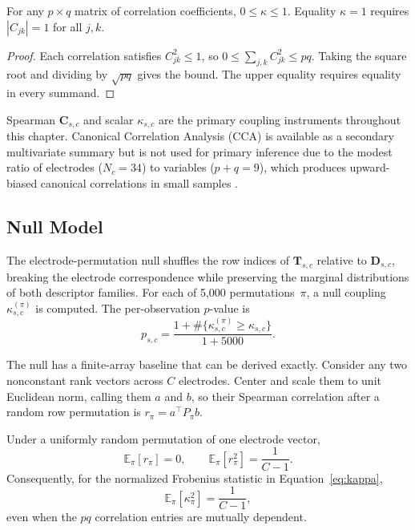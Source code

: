 \begin{proposition}
\label{prop:kappa_range}
For any $p\times q$ matrix of correlation coefficients,
$0\le\kappa\le1$. Equality $\kappa=1$ requires
$|C_{jk}|=1$ for all $j,k$.
\end{proposition}

\begin{proof}
Each correlation satisfies $C_{jk}^2\le1$, so
$0\le\sum_{j,k}C_{jk}^2\le pq$. Taking the square root and dividing by
$\sqrt{pq}$ gives the bound. The upper equality requires equality in every
summand.
\end{proof}

Spearman $\mathbf{C}_{s,c}$ and scalar $\kappa_{s,c}$ are the primary coupling instruments throughout this chapter. Canonical Correlation Analysis (CCA) is available as a secondary multivariate summary but is not used for primary inference due to the modest ratio of electrodes ($N_c = 34$) to variables ($p + q = 9$), which produces upward-biased canonical correlations in small samples \cite{wang_cca_2020}.

\subsection{Null Model}

The electrode-permutation null shuffles the row indices of $\mathbf{T}_{s,c}$ relative to $\mathbf{D}_{s,c}$, breaking the electrode correspondence while preserving the marginal distributions of both descriptor families. For each of 5,000 permutations~$\pi$, a null coupling $\kappa_{s,c}^{(\pi)}$ is computed. The per-observation $p$-value is
\begin{equation}
p_{s,c} = \frac{1 + \#\{\kappa_{s,c}^{(\pi)} \ge \kappa_{s,c}\}}{1 + 5000}.
\end{equation}

The null has a finite-array baseline that can be derived exactly. Consider any
two nonconstant rank vectors across $C$ electrodes. Center and scale them to unit
Euclidean norm, calling them $a$ and $b$, so their Spearman correlation after a
random row permutation is $r_\pi=a^\top P_\pi b$.

\begin{theorem}
\label{thm:permutation_coupling}
Under a uniformly random permutation of one electrode vector,
\begin{equation}
\mathbb{E}_\pi[r_\pi]=0,
\qquad
\mathbb{E}_\pi[r_\pi^2]=\frac{1}{C-1}.
\end{equation}
Consequently, for the normalized Frobenius statistic in
Equation~\eqref{eq:kappa},
\begin{equation}
\mathbb{E}_\pi[\kappa_\pi^2]=\frac{1}{C-1},
\end{equation}
even when the $pq$ correlation entries are mutually dependent.
\end{theorem}

